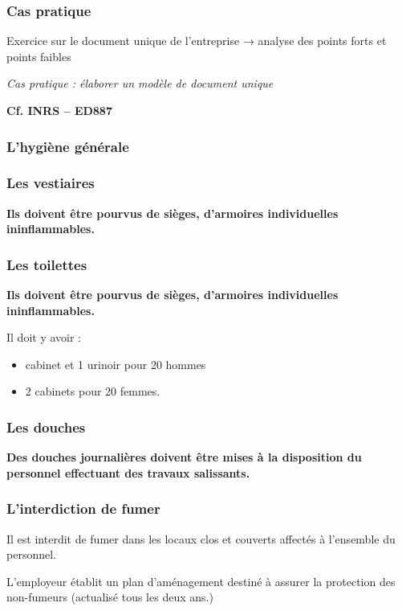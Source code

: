 \documentclass{beamer}
\begin{document}
\begin{frame}
\frametitle{Cas pratique}

Exercice sur le document unique de l’entreprise → analyse des points forts et points faibles

\textit{Cas pratique : élaborer un modèle de document unique} 

\textbf{Cf. INRS – ED887}

\end{frame}

\begin{frame}
\frametitle{L’hygiène générale}

\end{frame}

\begin{frame}
\frametitle{Les vestiaires}

\textbf{Ils doivent être pourvus de sièges, d’armoires individuelles ininflammables.}

\end{frame}

\begin{frame}
\frametitle{Les toilettes}

\textbf{Ils doivent être pourvus de sièges, d’armoires individuelles ininflammables.}

Il doit y avoir :
\begin{itemize}
        \item cabinet et 1 urinoir pour 20 hommes 
        \item 2 cabinets pour 20 femmes.
\end{itemize}
\end{frame}

\begin{frame}
\frametitle{Les douches}

\textbf{Des  douches journalières doivent être mises à la disposition du personnel effectuant des travaux salissants.}

\end{frame}

\begin{frame}
\frametitle{L’interdiction de fumer}

Il est interdit de fumer dans les locaux clos et couverts affectés à l’ensemble du personnel.

L’employeur établit un plan d’aménagement destiné à assurer la protection des non-fumeurs (actualisé tous les deux ans.)

\end{frame}
\end{document}
